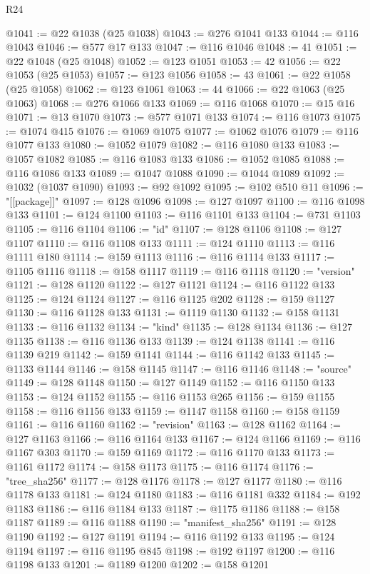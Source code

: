 \begin{lexlean}{R24}
\begin{coremodule}
{{{{{{{{{{{{{{{{{{{{{{{{{{{{{{{{{{{{{{{{{{{{{{{{{{{{{{{{{{{{{{{{{{{{{{{{{{{{{{{{{{{{{{{{{{{{{{{{{{{{{{{{{{{{{{{{{{{{{{{{{{{{{{{{{{{{{{{{{{{{{{{{{{{{{{{{{{{{{{{{{{{{{{{{{{{{{{{{{{{{{{{{{{{{{{{{{{{@1041 := @22 @1038 (@25 @1038)
@1043 := @276 @1041 @133
@1044 := @116 @1043
@1046 := @577 @17 @133
@1047 := @116 @1046
@1048 := 41
@1051 := @22 @1048 (@25 @1048)
@1052 := @123 @1051
@1053 := 42
@1056 := @22 @1053 (@25 @1053)
@1057 := @123 @1056
@1058 := 43
@1061 := @22 @1058 (@25 @1058)
@1062 := @123 @1061
@1063 := 44
@1066 := @22 @1063 (@25 @1063)
@1068 := @276 @1066 @133
@1069 := @116 @1068
@1070 := @15 @16
@1071 := @13 @1070
@1073 := @577 @1071 @133
@1074 := @116 @1073
@1075 := @1074 @415
@1076 := @1069 @1075
@1077 := @1062 @1076
@1079 := @116 @1077 @133
@1080 := @1052 @1079
@1082 := @116 @1080 @133
@1083 := @1057 @1082
@1085 := @116 @1083 @133
@1086 := @1052 @1085
@1088 := @116 @1086 @133
@1089 := @1047 @1088
@1090 := @1044 @1089
@1092 := @1032 (@1037 @1090)
@1093 := @92 @1092
@1095 := @102 @510 @11
@1096 := "[[package]]"
@1097 := @128 @1096
@1098 := @127 @1097
@1100 := @116 @1098 @133
@1101 := @124 @1100
@1103 := @116 @1101 @133
@1104 := @731 @1103
@1105 := @116 @1104
@1106 := "id"
@1107 := @128 @1106
@1108 := @127 @1107
@1110 := @116 @1108 @133
@1111 := @124 @1110
@1113 := @116 @1111 @180
@1114 := @159 @1113
@1116 := @116 @1114 @133
@1117 := @1105 @1116
@1118 := @158 @1117
@1119 := @116 @1118
@1120 := "version"
@1121 := @128 @1120
@1122 := @127 @1121
@1124 := @116 @1122 @133
@1125 := @124 @1124
@1127 := @116 @1125 @202
@1128 := @159 @1127
@1130 := @116 @1128 @133
@1131 := @1119 @1130
@1132 := @158 @1131
@1133 := @116 @1132
@1134 := "kind"
@1135 := @128 @1134
@1136 := @127 @1135
@1138 := @116 @1136 @133
@1139 := @124 @1138
@1141 := @116 @1139 @219
@1142 := @159 @1141
@1144 := @116 @1142 @133
@1145 := @1133 @1144
@1146 := @158 @1145
@1147 := @116 @1146
@1148 := "source"
@1149 := @128 @1148
@1150 := @127 @1149
@1152 := @116 @1150 @133
@1153 := @124 @1152
@1155 := @116 @1153 @265
@1156 := @159 @1155
@1158 := @116 @1156 @133
@1159 := @1147 @1158
@1160 := @158 @1159
@1161 := @116 @1160
@1162 := "revision"
@1163 := @128 @1162
@1164 := @127 @1163
@1166 := @116 @1164 @133
@1167 := @124 @1166
@1169 := @116 @1167 @303
@1170 := @159 @1169
@1172 := @116 @1170 @133
@1173 := @1161 @1172
@1174 := @158 @1173
@1175 := @116 @1174
@1176 := "tree_sha256"
@1177 := @128 @1176
@1178 := @127 @1177
@1180 := @116 @1178 @133
@1181 := @124 @1180
@1183 := @116 @1181 @332
@1184 := @192 @1183
@1186 := @116 @1184 @133
@1187 := @1175 @1186
@1188 := @158 @1187
@1189 := @116 @1188
@1190 := "manifest_sha256"
@1191 := @128 @1190
@1192 := @127 @1191
@1194 := @116 @1192 @133
@1195 := @124 @1194
@1197 := @116 @1195 @845
@1198 := @192 @1197
@1200 := @116 @1198 @133
@1201 := @1189 @1200
@1202 := @158 @1201
}}}}}}}}}}}}}}}}}}}}}}}}}}}}}}}}}}}}}}}}}}}}}}}}}}}}}}}}}}}}}}}}}}}}}}}}}}}}}}}}}}}}}}}}}}}}}}}}}}}}}}}}}}}}}}}}}}}}}}}}}}}}}}}}}}}}}}}}}}}}}}}}}}}}}}}}}}}}}}}}}}}}}}}}}}}}}}}}}}}}}}}}}}}}}}}}}}}
\end{coremodule}
\end{lexlean}
